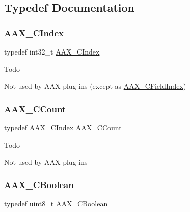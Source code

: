 \subsection{Typedef Documentation}
\mbox{\label{a00392_a24ac375fa55ccadbc3126e6d81146c28}} 
\subsubsection{\texorpdfstring{AAX\_CIndex}{AAX\_CIndex}}
{\footnotesize\ttfamily typedef int32\+\_\+t \mbox{\hyperlink{a00392_a24ac375fa55ccadbc3126e6d81146c28}{A\+A\+X\+\_\+\+C\+Index}}}

\begin{DoxyRefDesc}{Todo}
\item[\mbox{\hyperlink{a00785__todo000003}{Todo}}]Not used by A\+AX plug-\/ins (except as \mbox{\hyperlink{a00392_ae807f8986143820cfb5d6da32165c9c7}{A\+A\+X\+\_\+\+C\+Field\+Index}}) \end{DoxyRefDesc}
\mbox{\label{a00392_a9a9a14ab1486fa8c6734b96976be3056}} 
\subsubsection{\texorpdfstring{AAX\_CCount}{AAX\_CCount}}
{\footnotesize\ttfamily typedef \mbox{\hyperlink{a00392_a24ac375fa55ccadbc3126e6d81146c28}{A\+A\+X\+\_\+\+C\+Index}} \mbox{\hyperlink{a00392_a9a9a14ab1486fa8c6734b96976be3056}{A\+A\+X\+\_\+\+C\+Count}}}

\begin{DoxyRefDesc}{Todo}
\item[\mbox{\hyperlink{a00785__todo000004}{Todo}}]Not used by A\+AX plug-\/ins \end{DoxyRefDesc}
\mbox{\label{a00392_aa216506530f1d19a2965931ced2b274b}} 
\subsubsection{\texorpdfstring{AAX\_CBoolean}{AAX\_CBoolean}}
{\footnotesize\ttfamily typedef uint8\+\_\+t \mbox{\hyperlink{a00392_aa216506530f1d19a2965931ced2b274b}{A\+A\+X\+\_\+\+C\+Boolean}}}



